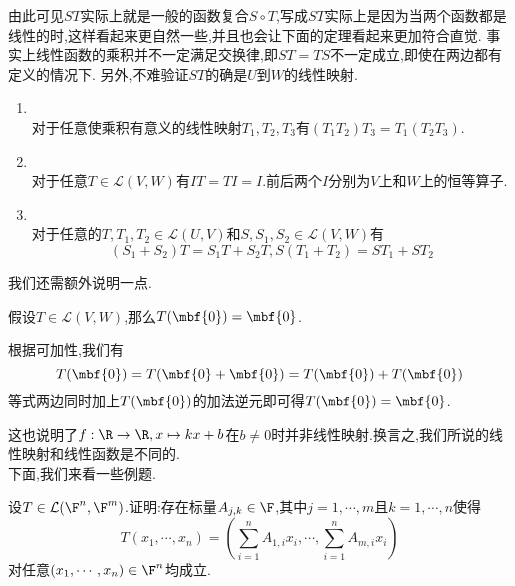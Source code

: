\documentclass{ctexart}
\begin{document}
由此可见$ST$实际上就是一般的函数复合$S\circ T$,写成$ST$实际上是因为当两个函数都是线性的时,这样看起来更自然一些,并且也会让下面的定理看起来更加符合直觉.
事实上线性函数的乘积并不一定满足交换律,即$ST=TS$不一定成立,即使在两边都有定义的情况下.
另外,不难验证$ST$的确是$U$到$W$的线性映射.
\begin{formal}[3.3 线性映射乘积的代数性质]
    \begin{enumerate}
        \item {}\\
            对于任意使乘积有意义的线性映射$T_1,T_2,T_3$有$(T_1T_2)T_3=T_1(T_2T_3)$.
        \item {}\\
            对于任意$T\in\mathcal{L}(V,W)$有$IT=TI=I$.前后两个$I$分别为$V$上和$W$上的恒等算子.
        \item {}\\
            对于任意的$T,T_1,T_2\in\mathcal{L}(U,V)$和$S,S_1,S_2\in\mathcal{L}(V,W)$有
            $$(S_1+S_2)T=S_1T+S_2T,S(T_1+T_2)=ST_1+ST_2$$
    \end{enumerate}
\end{formal}\noindent
我们还需额外说明一点.
\begin{formal}[3.4 加法恒等元的映射]
    假设$T\in\mathcal{L}(V,W)$,那么$T(\mbf{0})=\mbf{0}$.
\end{formal}
\begin{solution}[Proof.]
    根据可加性,我们有$$T(\mbf{0})=T(\mbf{0}+\mbf{0})=T(\mbf{0})+T(\mbf{0})$$
    等式两边同时加上$T(\mbf{0})$的加法逆元即可得$T(\mbf{0})=\mbf{0}$.
\end{solution}\noindent
这也说明了$f:\R\to\R,x\mapsto kx+b$在$b\neq0$时并非线性映射.换言之,我们所说的线性映射和线性函数是不同的.
\ \\
下面,我们来看一些例题.
\begin{problem}[Example 1.]
    设$T\in\mathcal{L}(\F^n,\F^m)$.证明:存在标量$A_{j,k}\in\F$,其中$j=1,\cdots,m$且$k=1,\cdots,n$使得
    $$T(x_1,\cdots,x_n)=\left(\sum_{i=1}^{n}A_{1,i}x_i,\cdots,\sum_{i=1}^{n}A_{m,i}x_i\right)$$
    对任意$(x_1,\cdots,x_n)\in\F^n$均成立.
\end{problem}
\end{document}
